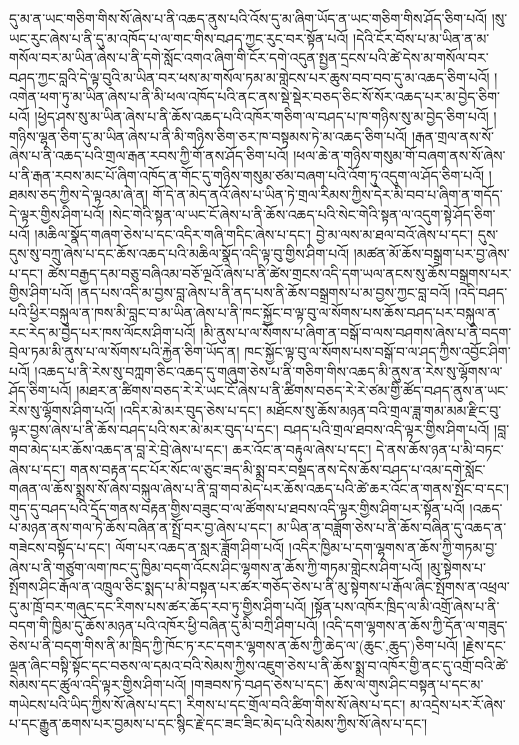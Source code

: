 དུ་མ་ན་ཡང་གཅིག་གིས་སོ་ཞེས་པ་ནི་འཆད་ནུས་པའི་འོས་དུ་མ་ཞིག་ཡོད་ན་ཡང་གཅིག་གིས་ཤོད་ཅིག་པའོ། །སུ་ཡང་རུང་ཞེས་པ་ནི་དུ་མ་འཁོད་པ་ལ་གང་གིས་བཤད་ཀྱང་རུང་བར་སྟོན་པའོ། །དེའི་ངོར་བོས་པ་མ་ཡིན་ན་མ་གསོལ་བར་མ་ཡིན་ཞེས་པ་ནི་དགེ་སློང་འགའ་ཞིག་གི་ངོར་དགེ་འདུན་སྤྱན་དྲངས་པའི་ཚེ་དེས་མ་གསོལ་བར་བཤད་ཀྱང་བླའི་དེ་ལྟ་བུའི་མ་ཡིན་བར་ཕས་མ་གསོལ་ཏམ་མ་གླེངས་པར་ཆུས་བབ་བབ་དུ་མ་འཆད་ཅིག་པའོ། །འགེན་ཕག་ཏུ་མ་ཡིན་ཞེས་པ་ནི་མི་ཕལ་འཁོད་པའི་ནང་ནས་སྡེ་སྡེར་བཅད་ཅིང་སོ་སོར་འཆད་པར་མ་བྱེད་ཅིག་པའོ། །ཕྱེད་ཤས་སུ་མ་ཡིན་ཞེས་པ་ནི་ཆོས་འཆད་པའི་འཁོར་གཅིག་ལ་བཤད་པ་ཁ་གཉིས་སུ་མ་བྱེད་ཅིག་པའོ། །གཉིས་ལྷན་ཅིག་དུ་མ་ཡིན་ཞེས་པ་ནི་མི་གཉིས་ཅིག་ཅར་ཁ་བསྟམས་ཏེ་མ་འཆད་ཅིག་པའོ། །རྒན་གྲལ་ནས་སོ་ཞེས་པ་ནི་འཆད་པའི་གྲལ་རྒན་རབས་ཀྱི་གོ་ནས་ཤོད་ཅིག་པའོ། །ཕལ་ཆེ་ན་གཉིས་གསུམ་གོ་བཞག་ནས་སོ་ཞེས་པ་ནི་རྒན་རབས་མང་པོ་ཞིག་འཁོད་ན་གོང་དུ་གཉིས་གསུམ་ཙམ་བཞག་པའི་འོག་ཏུ་འདུག་ལ་ཤོད་ཅིག་པའོ། །ཐམས་ཅད་ཀྱིས་དེ་ལྟའམ་ཞེ་ན། གོ་དེ་ན་མེད་ནའོ་ཞེས་པ་ཡིན་ཏེ་གྲལ་རིམས་ཀྱིས་དེར་མི་བབ་པ་ཞིག་ན་གདོད་དེ་ལྟར་གྱིས་ཤིག་པའོ། །སེང་གེའི་སྟན་ལ་ཡང་ངོ་ཞེས་པ་ནི་ཆོས་འཆད་པའི་སེང་གེའི་སྟན་ལ་འདུག་སྟེ་ཤོད་ཅིག་པའོ། །མཆིལ་སྣོད་གཞག་ཅེས་པ་དང་འདིར་གཞི་གདིང་ཞེས་པ་དང་། བྱེ་མ་ལས་མ་ཐལ་བའོ་ཞེས་པ་དང་། དུས་དུས་སུ་བཀྲུ་ཞེས་པ་དང་ཆོས་འཆད་པའི་མཆིལ་སྣོད་འདི་ལྟ་བུ་གྱིས་ཤིག་པའོ། །མཚན་མོ་ཆོས་བསྒྲག་པར་བྱ་ཞེས་པ་དང་། ཚེས་བརྒྱད་དམ་བཅུ་བཞིའམ་བཅོ་ལྔའོ་ཞེས་པ་ནི་ཚེས་གྲངས་འདི་དག་ཡལ་ནངས་སུ་ཆོས་བསྒྲགས་པར་གྱིས་ཤིག་པའོ། །ནད་པས་འདི་མ་བྱས་བླ་ཞེས་པ་ནི་ནད་པས་ནི་ཆོས་བསྒྲགས་པ་མ་བྱས་ཀྱང་བླ་བའོ། །འདི་བཤད་པའི་ཕྱིར་བསྐུལ་ན་ཁས་མི་བླང་བ་མ་ཡིན་ཞེས་པ་ནི་ཁང་སྐྱོང་བ་ལྟ་བུ་ལ་སོགས་པས་ཆོས་བཤད་པར་བསྐུལ་ན་རང་རེད་མ་བྱེད་པར་ཁས་ལོངས་ཤིག་པའོ། །མི་ནུས་པ་ལ་སོགས་པ་ཞིག་ན་བསྒོ་བ་ལས་བཤགས་ཞེས་པ་ནི་བདག་བྲེལ་ཏམ་མི་ནུས་པ་ལ་སོགས་པའི་རྐྱེན་ཅིག་ཡོད་ན། ཁང་སྐྱོང་ལྟ་བུ་ལ་སོགས་པས་བསྒོ་བ་ལ་ཤད་ཀྱིས་འབྱོང་ཤིག་པའོ། །འཆད་པ་ནི་རེས་སུ་བཀླག་ཅིང་འཆད་དུ་གཞུག་ཅེས་པ་ནི་གཅིག་གིས་འཆད་མི་ནུས་ན་རེས་སུ་ལྷོགས་ལ་ཤོད་ཅིག་པའོ། །མཐར་ན་ཚིགས་བཅད་རེ་རེ་ཡང་ངོ་ཞེས་པ་ནི་ཚིགས་བཅད་རེ་རེ་ཙམ་གྱི་ཚོད་བཤད་ནུས་ན་ཡང་རེས་སུ་ལྷོགས་ཤིག་པའོ། །འདིར་མེ་མར་བུད་ཅེས་པ་དང་། མཐོངས་སུ་ཆོས་མཉན་བའི་གྲལ་ཟླ་གམ་མམ་རྫིང་བུ་ལྟར་བྱས་ཞེས་པ་ནི་ཆོས་བཤད་པའི་སར་མེ་མར་བུད་པ་དང་། བཤད་པའི་གྲལ་ཐབས་འདི་ལྟར་གྱིས་ཤིག་པའོ། །བླ་གབ་མེད་པར་ཆོས་འཆད་ན་བླ་རེ་བྲེ་ཞེས་པ་དང་། ཆར་འོང་ན་བརྟུལ་ཞེས་པ་དང་། དེ་ནས་ཆོས་ཉན་པ་མི་བཏང་ཞེས་པ་དང་། གནས་བརྟན་དང་པོར་སོང་ལ་ཅུང་ཟད་མི་སྨྲ་བར་བསྡད་ནས་དེས་ཆོས་བཤད་པ་འམ་དགེ་སློང་གཞན་ལ་ཆོས་སྨྲས་སོ་ཞེས་བསྐུལ་ཞེས་པ་ནི་བླ་གབ་མེད་པར་ཆོས་འཆད་པའི་ཚེ་ཆར་འོང་ན་གནས་སྤོང་བ་དང་། གུད་དུ་བཤད་པའི་དྲོད་གནས་བརྟན་གྱིས་བཟུང་བ་ལ་ཚོགས་པ་ཐབས་འདི་ལྟར་གྱིས་ཤིག་པར་སྟོན་པའོ། །འཆད་པ་མཉན་ནས་གལ་ཏེ་ཆོས་བཞིན་ན་སྤྲོ་བར་བྱ་ཞེས་པ་དང་། མ་ཡིན་ན་བཟློག་ཅེས་པ་ནི་ཆོས་བཞིན་དུ་འཆད་ན་གཟེངས་བསྟོད་པ་དང་། ལོག་པར་འཆད་ན་སླར་ཟློག་ཤིག་པའོ། །འདིར་ཁྱིམ་པ་དག་ལྷགས་ན་ཆོས་ཀྱི་གཏམ་བྱ་ཞེས་པ་ནི་གཙུག་ལག་ཁང་དུ་ཁྱིམ་བདག་འོངས་ཤིང་ལྷགས་ན་ཆོས་ཀྱི་གཏམ་གླེངས་ཤིག་པའོ། །མུ་སྟེགས་པ་སྤོགས་ཤིང་རྒོལ་ན་འཁྲུལ་ཅིང་སྨད་པ་མི་བསྟན་པར་ཚར་གཅོད་ཅེས་པ་ནི་མུ་སྟེགས་པ་རྒོལ་ཞིང་སྤོགས་ན་འཕྲལ་དུ་མ་ཁྲོ་བར་གཞུང་དང་རིགས་པས་ཚར་ཆོད་རབ་ཏུ་གྱིས་ཤིག་པའོ། །སྟོན་པས་འཁོར་ཁྲིད་ལ་མི་འགྲོ་ཞེས་པ་ནི་བདག་གི་ཁྱིམ་དུ་ཆོས་མཉན་པའི་འཁོར་ཕྱི་བཞིན་དུ་མི་བཀྲི་ཤིག་པའོ། །འདི་དག་ལྷགས་ན་ཆོས་ཀྱི་དོན་ལ་གཟུད་ཅེས་པ་ནི་བདག་གིས་ནི་མ་ཁྲིད་ཀྱི་ཁོང་ཏ་རང་དགར་ལྷགས་ན་ཆོས་ཀྱི་ཆེད་ལ་(ཆུང་‚ཆུད་)ཅིག་པའོ། །རྗེས་དང་ལྡན་ཞིང་བསྟི་སྟོང་དང་བཅས་ལ་དམའ་བའི་སེམས་ཀྱིས་འཇུག་ཅེས་པ་ནི་ཆོས་སྨྲ་བ་འཁོར་གྱི་ནང་དུ་འགྲོ་བའི་ཚེ་སེམས་དང་ཚུལ་འདི་ལྟར་གྱིས་ཤིག་པའོ། །གཟབས་ཏེ་བཤད་ཅེས་པ་དང་། ཆོས་ལ་གུས་ཤིང་བསྟན་པ་དང་མ་གཡེངས་པའི་ཡིད་ཀྱིས་སོ་ཞེས་པ་དང་། རིགས་པ་དང་གྲོལ་བའི་ཚིག་གིས་སོ་ཞེས་པ་དང་། མ་འདྲེས་པར་རོ་ཞེས་པ་དང་རྒྱུན་ཆགས་པར་བྱམས་པ་དང་སྙིང་རྗེ་དང་ཟང་ཟིང་མེད་པའི་སེམས་ཀྱིས་སོ་ཞེས་པ་དང་། 